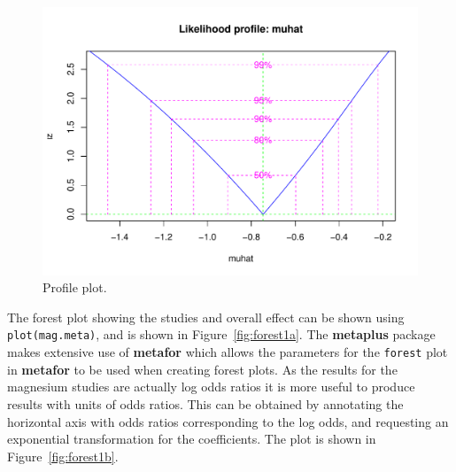 \documentclass{article}
\begin{document}
\begin{figure}
  \centering
\begin{Schunk}
\end{Schunk}
\includegraphics{metaplus-examples-003}
  \caption{Profile plot.}
  \label{fig:profile1}
\end{figure}

The forest plot showing the studies and overall effect can be shown using \texttt{plot(mag.meta)}, and is shown in Figure~\ref{fig:forest1a}. The \textbf{metaplus} package makes extensive use of \textbf{metafor} which allows the parameters for the \texttt{forest} plot in \textbf{metafor} to be used when creating forest plots. As the results for the magnesium studies are actually log odds ratios it is more useful to produce results with units of odds ratios. This can be obtained by annotating the horizontal axis with odds ratios corresponding to the log odds, and requesting an exponential transformation for the coefficients. The plot is shown in Figure~\ref{fig:forest1b}.
\end{document}
